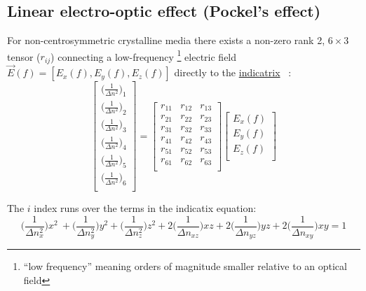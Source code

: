 \subsection{Linear electro-optic effect (Pockel's effect)}
For non-centrosymmetric crystalline media there exists a non-zero rank 2, $6 \times 3$ tensor ($r_{ij}$) connecting a low-frequency \footnote{``low frequency'' meaning orders of magnitude smaller relative to an optical field} electric field $\vec{E}(f) = [E_x(f), E_y(f), E_z(f)]$ directly to the \hyperref[sec:indicatrix]{indicatrix} ~\cite{yariv,nye}:
\begin{equation}
  \left[ {\begin{array}{c}
   \big( \frac{1}{\Delta n ^2 } \big)_1 \\
   \big( \frac{1}{\Delta n ^2 } \big)_2 \\
   \big( \frac{1}{\Delta n ^2 } \big)_3 \\
   \big( \frac{1}{\Delta n ^2 } \big)_4 \\
   \big( \frac{1}{\Delta n ^2 } \big)_5 \\
   \big( \frac{1}{\Delta n ^2 } \big)_6 \\
  \end{array} } \right]
  =
%
 \left[ {\begin{array}{ccc}
   r_{11} & r_{12} & r_{13}\\
   r_{21} & r_{22} & r_{23}\\
   r_{31} & r_{32} & r_{33}\\
   r_{41} & r_{42} & r_{43}\\
   r_{51} & r_{52} & r_{53}\\
   r_{61} & r_{62} & r_{63}\\
  \end{array}} \right]
 \left[{\begin{array}{c}
   E_x (f)\\
   E_y (f)\\
   E_z (f)\\
 \end{array}} \right]
\end{equation}

\noindent The $i$ index runs over the terms in the indicatix equation:
\begin{equation}
\bigg(\frac{1}{\Delta n_x^2} \bigg) x^2\ + \bigg(\frac{1}{\Delta n_y^2} \bigg) y^2 + \bigg(\frac{1}{\Delta n_z^2} \bigg) z^2 + 2 \bigg(\frac{1}{\Delta n_{xz}} \bigg)xz + 2 \bigg(\frac{1}{\Delta n_{yz}} \bigg)yz + 2 \bigg(\frac{1}{\Delta n_{xy}} \bigg)xy = 1
\end{equation}

